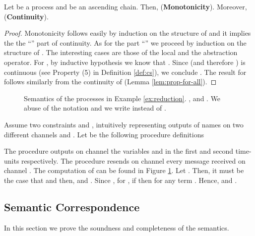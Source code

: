 \documentclass{tlp}
\begin{document}
\begin{proposition}\label{prop:cont-td}
Let  be a process and 
 be an 
ascending chain. Then,   ({\bf Monotonicity}). Moreover,     ({\bf Continuity}). 
\end{proposition}
\begin{proof}
Monotonicity follows easily by induction on the structure of  and it implies the the  ``'' part of continuity. As for the part ``'' we proceed by induction on the structure of .  The interesting cases are those of the local  and the abstraction operator. For , by inductive hypothesis we know that . Since  (and therefore ) is continuous (see Property (5) in Definition \ref{def:cs}),  we conclude 
.
The result for   follows similarly from the continuity of  (Lemma \ref{lem:prop-for-all}). 
\end{proof}

\begin{figure}
\resizebox{.8\textwidth}{!}{

}
\caption{Semantics of  the processes   in Example \ref{ex:reduction}.  
 ,  and . We abuse of the notation and we 
write  instead of .
\label{fig:comp-example-den-sem}}
\end{figure}
\begin{example}\label{ex:reduction}
Assume two constraints  and , intuitively representing  outputs of names on two different channels  and . Let  be the following procedure definitions
 
 
The procedure   outputs on channel  the variables  and  in the first and second time-units respectively. The procedure   resends on channel  every message received on channel . 
The computation of  can be found in Figure \ref{fig:comp-example-den-sem}. 
  Let . 
  Then, it must be the case that  and then,   and . Since , 
  for , if  then  for any term . Hence,  and . 
\end{example}

\subsection{Semantic Correspondence}
In this section we prove the soundness and completeness of the semantics.
\end{document}

